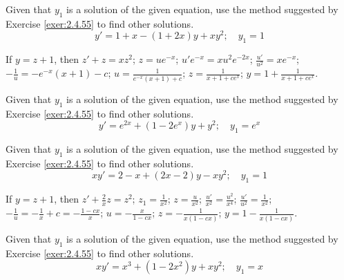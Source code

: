 \documentclass{ximera}
\begin{document}
\begin{problem}\label{exer:2.4.56} Given that $y_1$ is a solution of the given equation, use the method suggested by Exercise \ref{exer:2.4.55} to find other solutions.
$$y'=1+x - (1+2x)y+xy^2;  \quad    y_1=1$$



\begin{solution}
    If $y=z+1$, then
$z'+z=xz^2$;\;
$z=ue^{-x}$;\;
$u'e^{-x}=xu^2e^{-2x}$;\;
$\frac{u'}{ u^2}=xe^{-x}$;\;
$-\frac{1}{ u}=-e^{-x}(x+1)-c$;\;
$u=\frac{1}{ e^{-x}(x+1)+c}$;\;
$z=\frac{1}{ x+1+ce^x}$;\;
$y=1+\frac{1}{ x+1+ce^x}$.

\end{solution}
\end{problem}

\begin{problem}\label{exer:2.4.57} Given that $y_1$ is a solution of the given equation, use the
method suggested by Exercise \ref{exer:2.4.55} to find other solutions.
$$y'=e^{2x}+(1-2e^x)y+y^2;  \quad    y_1=e^x$$
\end{problem}

\begin{problem}\label{exer:2.4.58} Given that $y_1$ is a solution of the given equation, use the
method suggested by Exercise \ref{exer:2.4.55} to find other solutions.
$$xy'=2-x+(2x-2)y-xy^2;  \quad    y_1=1$$



\begin{solution}
    If $y=z+1$, then
$z'+\frac{2}{ x}z=z^2$;\;
$z_1=\frac{1}{ x^2}$;\;
$z=\frac{u}{ x^2}$;\;
$\frac{u'}{ x^2}=\frac{u^2}{ x^4}$;\;
$\frac{u'}{ u^2}=\frac{1}{ x^2}$;\;
$-\frac{1}{ u}=-\frac{1}{ x}+c=-\frac{1-cx}{ x}$;\;
$u=-\frac{x}{ 1-cx}$;\;
$z=-\frac{1}{ x(1-cx)}$;\;
$y=1-\frac{1}{ x(1-cx)}$.

\end{solution}
\end{problem}

\begin{problem}\label{exer:2.4.59} Given that $y_1$ is a solution of the given equation, use the
method suggested by Exercise \ref{exer:2.4.55} to find other solutions.
$$xy'=x^3+(1-2x^2)y+xy^2;  \quad    y_1=x$$
\end{problem}
\end{document}
